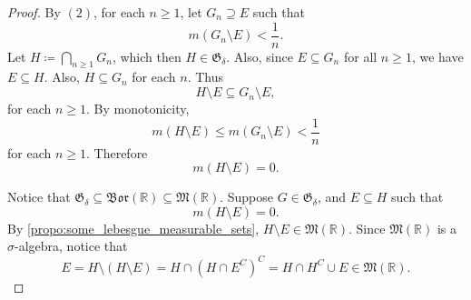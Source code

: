 \documentclass[notoc,notitlepage]{tufte-book}
\newcommand{\Bor}{\mathfrak{Bor}}
\begin{document}
\begin{proof}
  \noindent
   By $(2)$, for each $n \geq 1$, let $G_n
  \supseteq E$ such that
  \begin{equation*}
    m (G_n \setminus E) < \frac{1}{n}.
  \end{equation*}
  Let $H \coloneqq \bigcap_{n \geq 1} G_n$, which then $H \in
  \mathfrak{G}_{\delta}$. Also, since $E \subseteq G_n$ for all $n \geq 1$, we
  have $E \subseteq H$. Also, $H \subseteq G_n$ for each $n$. Thus
  \begin{equation*}
    H \setminus E \subseteq G_n \setminus E,
  \end{equation*}
  for each $n \geq 1$. By monotonicity,
  \begin{equation*}
    m(H \setminus E) \leq m(G_n \setminus E) < \frac{1}{n}
  \end{equation*}
  for each $n \geq 1$. Therefore
  \begin{equation*}
    m(H \setminus E) = 0.
  \end{equation*}

  \noindent
   Notice that $\mathfrak{G}_{\delta} \subseteq
  \Bor(\mathbb{R}) \subseteq \mathfrak{M}(\mathbb{R})$. Suppose $G \in
  \mathfrak{G}_{\delta}$, and $E \subseteq H$ such that
  \begin{equation*}
    m(H \setminus E) = 0.
  \end{equation*}
  By \cref{propo:some_lebesgue_measurable_sets}, $H \setminus E \in
  \mathfrak{M}(\mathbb{R})$. Since $\mathfrak{M}(\mathbb{R})$ is a
  $\sigma$-algebra, notice that
  \begin{equation*}
    E = H \setminus (H \setminus E) = H \cap (H \cap E^C)^C = H \cap H^C \cup E
    \in \mathfrak{M}(\mathbb{R}).
  \end{equation*}
\end{proof}



\appendix

\backmatter

\fancyhead[LE]{\thepage \enspace \textsl{\leftmark}}



\printindex
\end{document}
